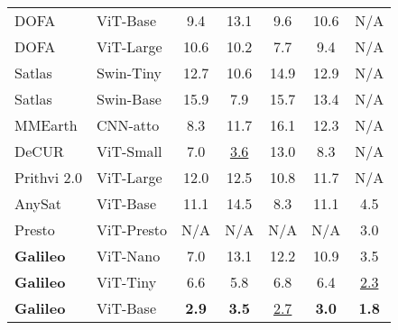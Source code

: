 \begin{table}[!t]
\begin{tabular}{
        l
        l
        c
        c
        c
        c
        c
    }
        DOFA \cite{xiong2024neural} & ViT-Base& {\color{customgray} 9.4} & {\color{customgray} 13.1} & {\color{customgray} 9.6} & 10.6 & {\color{missinggray} N/A} \\
        DOFA \cite{xiong2024neural} & ViT-Large& {\color{customgray} 10.6} & {\color{customgray} 10.2} & {\color{customgray} 7.7} & 9.4 & {\color{missinggray} N/A} \\
        Satlas \cite{bastani2023satlaspretrain} & Swin-Tiny & {\color{customgray} 12.7} & {\color{customgray} 10.6} & {\color{customgray}14.9} & 12.9 & {\color{missinggray} N/A} \\
        Satlas \cite{bastani2023satlaspretrain} & Swin-Base & {\color{customgray} 15.9} & {\color{customgray} 7.9} & {\color{customgray} 15.7} & 13.4 & {\color{missinggray} N/A} \\
        MMEarth \cite{nedungadi2024mmearth} & CNN-atto & {\color{customgray} 8.3} & {\color{customgray} 11.7} & {\color{customgray} 16.1} & 12.3 & {\color{missinggray} N/A} \\
        DeCUR \cite{wang2024decoupling} & ViT-Small& {\color{customgray} 7.0} & {\color{customgray} \underline{3.6}} & {\color{customgray} 13.0} & 8.3 & {\color{missinggray} N/A}  \\
        Prithvi 2.0 \cite{szwarcman2024prithvi} & ViT-Large & {\color{customgray} 12.0} & {\color{customgray} 12.5} & {\color{customgray} 10.8} & 11.7 & {\color{missinggray} N/A} \\
        AnySat \cite{astruc2024anysat} & ViT-Base& {\color{customgray} 11.1} & {\color{customgray} 14.5} & {\color{customgray} 8.3} & 11.1 & 4.5 \\
        Presto \cite{tseng2023lightweight} & ViT-Presto & {\color{missinggray} N/A} & {\color{missinggray} N/A} & {\color{missinggray} N/A} & {\color{missinggray} N/A} & 3.0 \\
        \color{ourcolor}\textbf{Galileo} & ViT-Nano & {\color{customgray} 7.0} & {\color{customgray} 13.1} & {\color{customgray} 12.2} &  10.9 & 3.5  \\
        \color{ourcolor}\textbf{Galileo} & ViT-Tiny & {\color{customgray} 6.6} & {\color{customgray} 5.8} & {\color{customgray} 6.8} & 6.4 & \underline{2.3} \\
        \color{ourcolor}\textbf{Galileo} & ViT-Base & {\color{customgray} \textbf{2.9}} & {\color{customgray} \textbf{3.5}} & {\color{customgray} \underline{2.7}} & \textbf{3.0} & \textbf{1.8} \\
        \bottomrule
    \end{tabular}
\end{table}